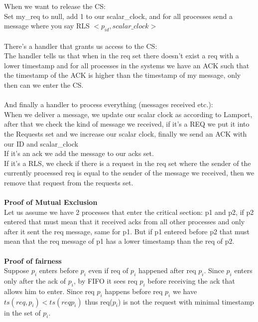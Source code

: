 \documentclass[11pt, a4paper]{article}
\begin{document}
When we want to release the CS:\\
Set my\_req to null, add 1 to our scalar\_clock, and for all processes send a message where you say RLS $<p_{id},scalar\_clock>$\\\\
There's a handler that grants us access to the CS:\\
The handler tells us that when in the req set there doesn't exist a req with a lower timestamp and for all processes in the systems we have an ACK such that the timestamp of the ACK is higher than the timestamp of my message, only then can we enter the CS.\\\\
And finally a handler to process everything (messages received etc.):\\
When we deliver a message, we update our scalar clock as according to Lamport, after that we check the kind of message we received, if it's a REQ we put it into the Requests set and we increase our scalar clock, finally we send an ACK with our ID and scalar\_clock\\
If it's an ack we add the message to our acks set.\\
If it's a RLS, we check if there is a request in the req set where the sender of the currently processed req is equal to the sender of the message we received, then we remove that request from the requests set.\\\\
\textbf{Proof of Mutual Exclusion}\\
Let us assume we have 2 processes that enter the critical section: p1 and p2, if p2 entered that must mean that it received acks from all other processes and only after it sent the req message, same for p1. But if p1 entered before p2 that must mean that the req message of p1 has a lower timestamp than the req of p2.\\\\
\textbf{Proof of fairness}\\
Suppose $p_i$ enters before $p_i$ even if req of $p_i$ happened after req $p_i$. Since $p_i$ enters only after the ack of $p_i$, by FIFO it sees req $p_i$ before receiving the ack that allows him to enter.
Since req $p_i$ happens before req $p_i$ we have $ts(req,p_i) < ts(req p_i)$ thus req($p_i$) is not the request with minimal timestamp in the set of $p_i$.
\end{document}
